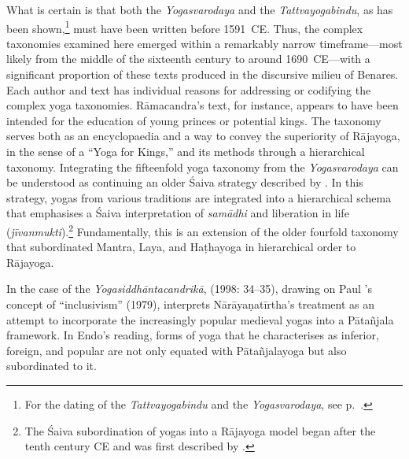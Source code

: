 What is certain is that both the \textit{Yogasvarodaya} and the \textit{Tattvayogabindu}, as has been shown,\footnote{For the dating of the \textit{Tattvayogabindu} and the \textit{Yogasvarodaya}, see p.~\pageref{dating}.} must have been written before 1591~CE. Thus, the complex taxonomies examined here emerged within a remarkably narrow timeframe---most likely from the middle of the sixteenth century to around 1690~CE---with a significant proportion of these texts produced in the discursive milieu of Benares.
Each author and text has individual reasons for addressing or codifying the complex yoga taxonomies. Rāmacandra's text, for instance, appears to have been intended for the education of young princes or potential kings. The taxonomy serves both as an encyclopaedia and a way to convey the superiority of Rājayoga, in the sense of a ``Yoga for Kings,'' and its methods through a hierarchical taxonomy. Integrating the fifteenfold yoga taxonomy from the \textit{Yogasvarodaya} can be understood as continuing an older Śaiva strategy described by \citeauthor[2019]{birch2019}. In this strategy, yogas from various traditions are integrated into a hierarchical schema that emphasises a Śaiva interpretation of \textit{samādhi} and liberation in life (\textit{jīvanmukti}).\footnote{The Śaiva subordination of yogas into a Rājayoga model began after the tenth century CE and was first described by \citeauthor[2019]{birch2019}.} Fundamentally, this is an extension of the older fourfold taxonomy that subordinated Mantra, Laya, and Haṭhayoga in hierarchical order to Rājayoga.

In the case of the \textit{Yogasiddhāntacandrikā}, \citeauthor{endo1998} (1998: 34–35), drawing on Paul \citeauthor{hacker1979}'s concept of ``inclusivism'' (1979), interprets Nārāyaṇatīrtha's treatment as an attempt to incorporate the increasingly popular medieval yogas into a Pātañjala framework. In Endo's reading, forms of yoga that he characterises as inferior, foreign, and popular are not only equated with Pātañjalayoga but also subordinated to it.

